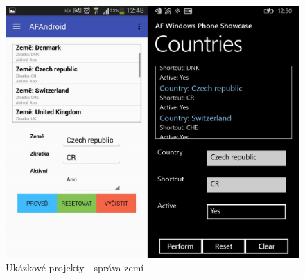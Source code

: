 \begin{figure}
\includegraphics[width=\linewidth]{figures/screenshots/Countries}
\caption{Ukázkové projekty - správa zemí}  
\label{img:country}
\end{figure}

